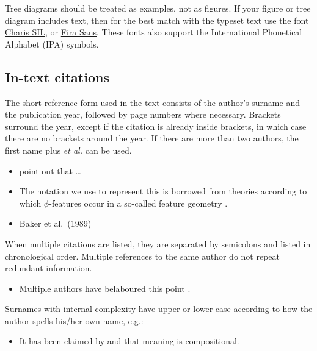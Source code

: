 \documentclass[cm,linguex]{glossa}
\providecommand{\tightlist}{%
  \setlength{\itemsep}{0pt}\setlength{\parskip}{0pt}}
\begin{document}
Tree diagrams should be treated as examples, not as figures. If your
figure or tree diagram includes text, then for the best match with the
typeset text use the font
\href{https://software.sil.org/charis/download/}{Charis SIL}, or
\href{https://www.fontsquirrel.com/fonts/fira-sans}{Fira Sans}. These
fonts also support the International Phonetical Alphabet (IPA) symbols.

\hypertarget{in-text-citations}{%
\subsection{In-text citations}\label{in-text-citations}}

The short reference form used in the text consists of the author's
surname and the publication year, followed by page numbers where
necessary. Brackets surround the year, except if the citation is already
inside brackets, in which case there are no brackets around the year. If
there are more than two authors, the first name plus \emph{et al.} can
be used.

\begin{itemize}
\item
  \citet[514]{murray:1983} point out that \ldots{}
\item
  The notation we use to represent this is borrowed from theories
  according to which \(\phi\)-features occur in a so-called feature
  geometry \citep[ 248-250]{mccarthy:1999}.
\item
  Baker et al.~(1989) = \citet{baker:1989}
\end{itemize}

When multiple citations are listed, they are separated by semicolons and
listed in chronological order. Multiple references to the same author do
not repeat redundant information.

\begin{itemize}
\tightlist
\item
  Multiple authors have belaboured this point
  \citep{chomsky:1981, chomsky:1986a, chomsky:1986, iverson:1989, casali:1998a, blevins:2004, franks:2005}.
\end{itemize}

Surnames with internal complexity have upper or lower case according to
how the author spells his/her own name, e.g.:

\begin{itemize}
\tightlist
\item
  It has been claimed by \citet{swart:1998} and \citet{belder:2011} that
  meaning is compositional.
\end{itemize}
\end{document}
